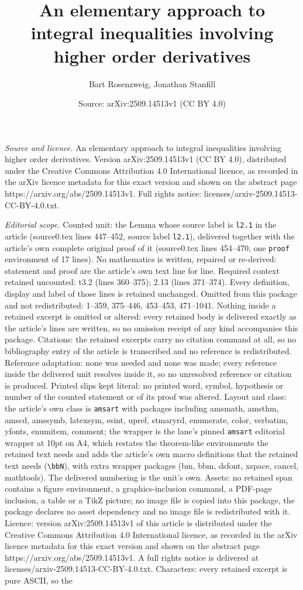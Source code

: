 \documentclass[10pt,a4paper]{amsart}
\title[An elementary approach to integral inequalities involving hi]{An elementary approach to integral inequalities involving higher order derivatives}
\author{Bart Rosenzweig, Jonathan Stanfill}
\date{Source: arXiv:2509.14513v1 (CC BY 4.0)}
\begin{document}
\maketitle

\noindent\emph{Source and licence.} An elementary approach to integral inequalities involving higher order derivatives. Version arXiv:2509.14513v1 (CC BY 4.0), distributed under the Creative Commons Attribution 4.0 International licence, as recorded in the arXiv licence metadata for this exact version and shown on the abstract page https://arxiv.org/abs/2509.14513v1. Full rights notice: licenses/arxiv-2509.14513-CC-BY-4.0.txt.\par\smallskip

\noindent\textit{Editorial scope.} Counted unit: the Lemma whose source label is \texttt{l2.1} in the article (source0.tex lines 447--452, source label \texttt{l2.1}), delivered together with the article's own complete original proof of it (source0.tex lines 454--470, one \texttt{proof} environment of 17 lines). No mathematics is written, repaired or re-derived: statement and proof are the article's own text line for line. Required context retained uncounted: t3.2 (lines 360--375); 2.13 (lines 371--374). Every definition, display and label of those lines is retained unchanged. Omitted from this package and not redistributed: 1--359, 375--446, 453--453, 471--1041. Nothing inside a retained excerpt is omitted or altered: every retained body is delivered exactly as the article's lines are written, so no omission receipt of any kind accompanies this package. Citations: the retained excerpts carry no citation command at all, so no bibliography entry of the article is transcribed and no reference is redistributed. Reference adaptation: none was needed and none was made; every reference inside the delivered unit resolves inside it, so no unresolved reference or citation is produced. Printed slips kept literal: no printed word, symbol, hypothesis or number of the counted statement or of its proof was altered. Layout and class: the article's own class is \texttt{amsart} with packages including amsmath, amsthm, amscd, amssymb, latexsym, esint, upref, stmaryrd, enumerate, color, verbatim, yfonts, enumitem, comment; the wrapper is the lane's pinned \texttt{amsart} editorial wrapper at 10pt on A4, which restates the theorem-like environments the retained text needs and adds the article's own macro definitions that the retained text needs (\texttt{\textbackslash bbN}), with extra wrapper packages (bm, bbm, dsfont, xspace, cancel, mathtools). The delivered numbering is the unit's own. Assets: no retained span contains a figure environment, a graphics-inclusion command, a PDF-page inclusion, a table or a TikZ picture; no image file is copied into this package, the package declares no asset dependency and no image file is redistributed with it. Licence: version arXiv:2509.14513v1 of this article is distributed under the Creative Commons Attribution 4.0 International licence, as recorded in the arXiv licence metadata for this exact version and shown on the abstract page https://arxiv.org/abs/2509.14513v1. A full rights notice is delivered at licenses/arxiv-2509.14513-CC-BY-4.0.txt. Characters: every retained excerpt is pure ASCII, so the 
\end{document}
